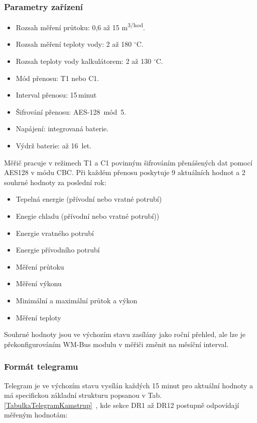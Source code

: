 		
\subsubsection{Parametry zařízení}
\begin{itemize}
	\item Rozsah měření průtoku: 0,6 až 15 m\textsuperscript{3/hod}.
	\item Rozsah měření teploty vody: 2 až 180 $^{\circ}$C.
	\item Rozsah teploty vody kalkulátorem: 2 až 130 $^{\circ}$C.
	\item Mód přenosu: T1 nebo C1.
	\item Interval přenosu: 15\,minut 
	\item Šifrování přenosu: AES-128~mód~5.
	\item Napájení: integrovaná baterie.
	\item Výdrž baterie: až 16~let.
\end{itemize}

\vspace{+10pt}	
	
Měřič pracuje v režimech T1 a C1  povinným šifrováním přenášených dat pomocí AES128 v módu CBC. Při každém přenosu poskytuje 9 aktuálních hodnot a 2 souhrné hodnoty za poslední rok:

\begin{itemize}
	\item Tepelná energie (přívodní nebo vratné potrubí)
	\item Enegie chladu (přívodní nebo vratné potrubí))
	\item Energie vratného potrubí
	\item Energie přívodního potrubí
	\item Měření průtoku
	\item Měření výkonu
	\item Minimální a maximální průtok a výkon
	\item Měření teploty
\end{itemize}

\vspace{+10pt}	

Souhrné hodnoty jsou ve výchozím stavu zasílány jako roční přehled, ale lze je překonfigurováním WM-Bus modulu v měřiči změnit na měsíční interval.

\subsubsection{Formát telegramu}
Telegram je ve výchozím stavu vysílán každých 15 minut pro aktuální hodnoty a má specifickou základní strukturu popsanou v Tab. \ref{TabulkaTelegramKamstrup}~\cite{CidloKamstrup}, kde sekce DR1 až DR12 postupně odpovídají měřeným hodnotám:


